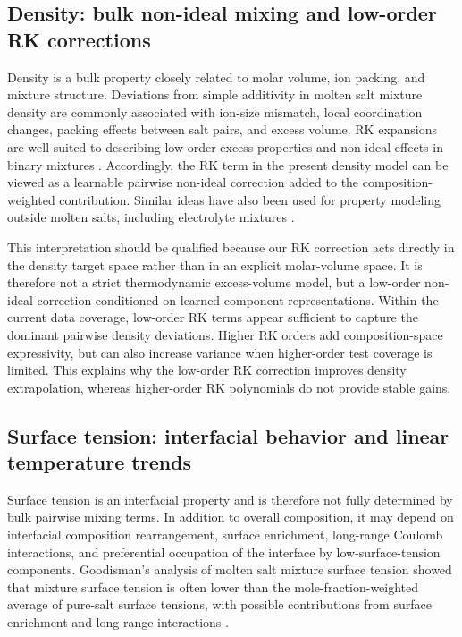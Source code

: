 \documentclass[journal=jctcce,manuscript=article,doi=true]{achemso}
\begin{document}
\subsection{Density: bulk non-ideal mixing and low-order RK corrections}\label{sec:discussion-density}

Density is a bulk property closely related to molar volume, ion packing, and mixture structure. Deviations from simple additivity in molten salt mixture density are commonly associated with ion-size mismatch, local coordination changes, packing effects between salt pairs, and excess volume. RK expansions are well suited to describing low-order excess properties and non-ideal effects in binary mixtures \cite{redlich1948algebraic,birri2022redlich,birri2024viscosity,prausnitz1999molecular}. Accordingly, the RK term in the present density model can be viewed as a learnable pairwise non-ideal correction added to the composition-weighted contribution. Similar ideas have also been used for property modeling outside molten salts, including electrolyte mixtures \cite{zhu2024diffmix}.

This interpretation should be qualified because our RK correction acts directly in the density target space rather than in an explicit molar-volume space. It is therefore not a strict thermodynamic excess-volume model, but a low-order non-ideal correction conditioned on learned component representations. Within the current data coverage, low-order RK terms appear sufficient to capture the dominant pairwise density deviations. Higher RK orders add composition-space expressivity, but can also increase variance when higher-order test coverage is limited. This explains why the low-order RK correction improves density extrapolation, whereas higher-order RK polynomials do not provide stable gains.

\subsection{Surface tension: interfacial behavior and linear temperature trends}\label{sec:discussion-surface-tension}

Surface tension is an interfacial property and is therefore not fully determined by bulk pairwise mixing terms. In addition to overall composition, it may depend on interfacial composition rearrangement, surface enrichment, long-range Coulomb interactions, and preferential occupation of the interface by low-surface-tension components. Goodisman's analysis of molten salt mixture surface tension showed that mixture surface tension is often lower than the mole-fraction-weighted average of pure-salt surface tensions, with possible contributions from surface enrichment and long-range interactions \cite{goodisman1980surface}.
\end{document}
